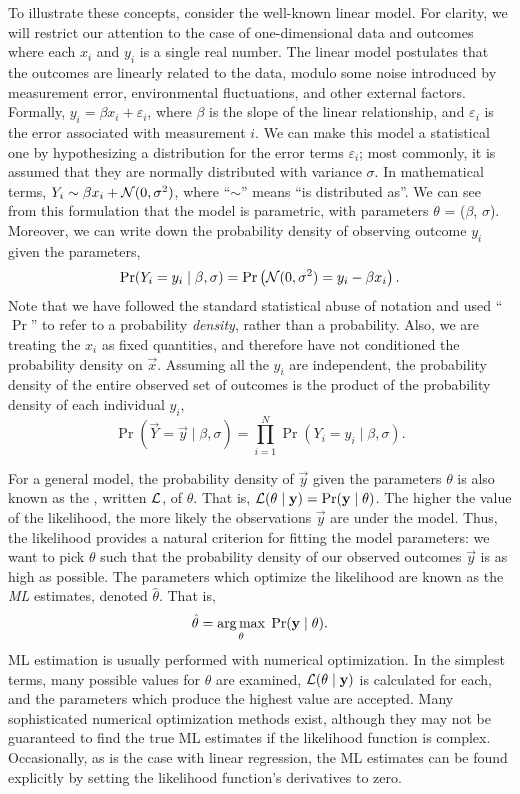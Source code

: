 To illustrate these concepts, consider the well-known linear model. For
clarity, we will restrict our attention to the case of one-dimensional data and
outcomes where each $x_i$ and $y_i$ is a single real number. The linear model
postulates that the outcomes are linearly related to the data, modulo some
noise introduced by measurement error, environmental fluctuations, and other
external factors. Formally, $y_i = \beta x_i + \varepsilon_i$, where $\beta$ is
the slope of the linear relationship, and $\varepsilon_i$ is the error
associated with measurement $i$. We can make this model a statistical one by
hypothesizing a distribution for the error terms $\varepsilon_i$; most
commonly, it is assumed that they are normally distributed with variance
$\sigma$. In mathematical terms, $Y_i \sim \beta x_i + \mathcal{N}(0, \sigma^2)$, where
``$\sim$'' means ``is distributed as''. We can see from this formulation that
the model is parametric, with parameters $\theta$ = ($\beta$, $\sigma$).
Moreover, we can write down the probability density of observing outcome $y_i$
given the parameters,
\[
  \Pr(Y_i = y_i \mid \beta, \sigma) = 
  \Pr\left(\mathcal{N}(0, \sigma^2) = y_i - \beta x_i\right).
\]
Note that we have followed the standard statistical abuse of notation and used
``$\Pr$'' to refer to a probability \emph{density}, rather than a probability.
Also, we are treating the $x_i$ as fixed quantities, and therefore have not
conditioned the probability density on $\vec{x}$. Assuming all the $y_i$ are
independent, the probability density of the entire observed set of outcomes is
the product of the probability density of each individual $y_i$,
\[
  \Pr(\vec{Y} = \vec{y} \mid \beta, \sigma) = 
  \prod_{i=1}^N \Pr(Y_i = y_i \mid \beta, \sigma).
\]

For a general model, the probability density of $\vec{y}$ given the parameters
$\theta$ is also known as the , written $\mathcal{L}$, of $\theta$.
That is, $\mathcal{L}(\theta \mid \mathbf{y}) = \Pr(\mathbf{y} \mid \theta)$. The higher the
value of the likelihood, the more likely the observations $\vec{y}$ are under
the model. Thus, the likelihood provides a natural criterion for fitting the
model parameters: we want to pick $\theta$ such that the probability density of
our observed outcomes $\vec{y}$ is as high as possible. The parameters which
optimize the likelihood are known as the \textit{\gls{ML}} estimates, denoted
$\hat{\theta}$. That is,
\[
  \hat{\theta} = \operatorname*{arg\,max}_\theta\; \Pr(\mathbf{y} \mid \theta).
\]
\Gls{ML} estimation is usually performed with numerical optimization. In the
simplest terms, many possible values for $\theta$ are examined, $\mathcal{L}(\theta \mid
\mathbf{y})$ is calculated for each, and the parameters which produce the highest
value are accepted. Many sophisticated numerical optimization methods exist,
although they may not be guaranteed to find the true \gls{ML} estimates if the
likelihood function is complex. Occasionally, as is the case with linear
regression, the \gls{ML} estimates can be found explicitly by setting the
likelihood function's derivatives to zero.

